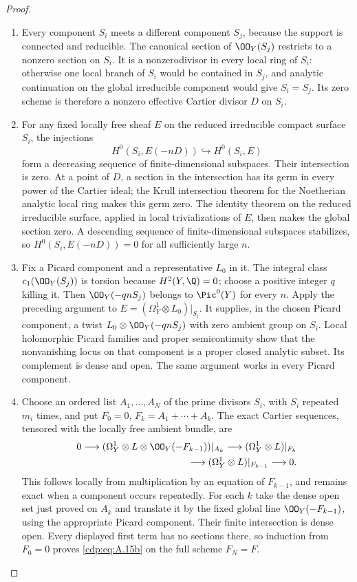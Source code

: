 \begin{proof}

\begin{enumerate}[label={$\langle1\rangle$\arabic*.},leftmargin=*]
\item Every component $S_i$ meets a different component $S_j$, because the support is connected and reducible. The canonical section of $\OO_Y(S_j)$ restricts to a nonzero section on $S_i$. It is a nonzerodivisor in every local ring of $S_i$: otherwise one local branch of $S_i$ would be contained in $S_j$, and analytic continuation on the global irreducible component would give $S_i=S_j$. Its zero scheme is therefore a nonzero effective Cartier divisor $D$ on $S_i$.

\item For any fixed locally free sheaf $E$ on the reduced irreducible compact surface $S_i$, the injections
\[
 H^0(S_i,E(-nD))\hookrightarrow H^0(S_i,E)
\]
form a decreasing sequence of finite-dimensional subspaces. Their intersection is zero. At a point of $D$, a section in the intersection has its germ in every power of the Cartier ideal; the Krull intersection theorem for the Noetherian analytic local ring makes this germ zero. The identity theorem on the reduced irreducible surface, applied in local trivializations of $E$, then makes the global section zero. A descending sequence of finite-dimensional subspaces stabilizes, so $H^0(S_i,E(-nD))=0$ for all sufficiently large $n$.

\item Fix a Picard component and a representative $L_0$ in it. The integral class $c_1(\OO_Y(S_j))$ is torsion because $H^2(Y,\Q)=0$; choose a positive integer $q$ killing it. Then $\OO_Y(-qnS_j)$ belongs to $\Pic^0(Y)$ for every $n$. Apply the preceding argument to $E=(\Omega_Y^1\otimes L_0)|_{S_i}$. It supplies, in the chosen Picard component, a twist $L_0\otimes\OO_Y(-qnS_j)$ with zero ambient group on $S_i$. Local holomorphic Picard families and proper semicontinuity show that the nonvanishing locus on that component is a proper closed analytic subset. Its complement is dense and open. The same argument works in every Picard component.

\item Choose an ordered list $A_1,\ldots,A_N$ of the prime divisors $S_i$, with $S_i$ repeated $m_i$ times, and put $F_0=0$, $F_k=A_1+\cdots+A_k$. The exact Cartier sequences, tensored with the locally free ambient bundle, are
\[
\begin{split}
0\longrightarrow
 (\Omega_Y^1\otimes L\otimes\OO_Y(-F_{k-1}))|_{A_k}
 \longrightarrow (\Omega_Y^1\otimes L)|_{F_k}\\
 \longrightarrow(\Omega_Y^1\otimes L)|_{F_{k-1}}
 \longrightarrow0.
\end{split}
\]
This follows locally from multiplication by an equation of $F_{k-1}$, and remains exact when a component occurs repeatedly. For each $k$ take the dense open set just proved on $A_k$ and translate it by the fixed global line $\OO_Y(-F_{k-1})$, using the appropriate Picard component. Their finite intersection is dense open. Every displayed first term has no sections there, so induction from $F_0=0$ proves \eqref{cdp:eq:A.15b} on the full scheme $F_N=F$.


\end{enumerate}
\end{proof}
